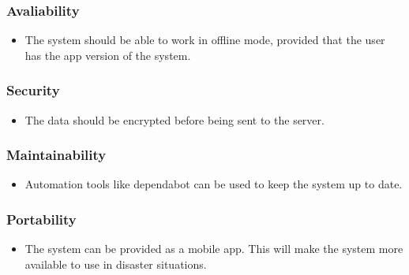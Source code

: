 \documentclass[a4paper]{article}
\begin{document}
            \subsubsection{Avaliability}
            \begin{itemize}
                \item The system should be able to work in offline mode, provided that the user has the app version of the system.
            \end{itemize}
            
            \subsubsection{Security}
            \begin{itemize}
                \item The data should be encrypted before being sent to the server.
            \end{itemize}

            \subsubsection{Maintainability}
            \begin{itemize}
                \item Automation tools like dependabot can be used to keep the system up to date.
            \end{itemize}

            \subsubsection{Portability}
            \begin{itemize}
                \item The system can be provided as a mobile app. This will make the system more available to use in disaster situations.
            \end{itemize}
\end{document}
